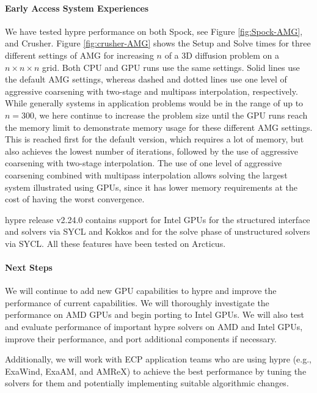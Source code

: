 \paragraph{Early Access System Experiences}

We have tested hypre performance on both Spock, see Figure \ref{fig:Spock-AMG}, and Crusher.  Figure \ref{fig:crusher-AMG} 
shows the Setup and Solve times for three different settings of AMG for increasing $n$ of a 3D diffusion problem on a $n \times n \times n$ grid. Both CPU and GPU runs use the same settings. Solid lines use the default AMG settings, whereas dashed and dotted lines use one level of aggressive coarsening with two-stage and multipass interpolation, respectively. While generally systems in application problems would be in the range of up to $n=300$, we here continue to increase the problem size until the GPU runs reach the memory limit to demonstrate memory usage for these different AMG settings. This is reached first for the default version, which requires a lot of memory, but also achieves the lowest number of iterations, followed by the use of aggressive coarsening with two-stage interpolation. The use of one level of aggressive coarsening combined with multipass interpolation allows solving the largest system illustrated using GPUs, since it has lower memory requirements at the cost of having the worst convergence.  

hypre release v2.24.0 contains support for Intel GPUs for the structured interface and solvers via SYCL and Kokkos and for the solve phase of unstructured solvers via SYCL. All these features have been tested on Arcticus.

\paragraph{Next Steps}
We will continue to add new GPU capabilities to hypre and improve the performance of current capabilities. We will thoroughly investigate the performance on AMD GPUs and begin porting to Intel GPUs.
We will also test and evaluate performance of important hypre solvers on AMD and Intel GPUs, improve their performance, and port additional components if necessary.

Additionally, we will work with ECP application teams who are using hypre (e.g., ExaWind, ExaAM, and AMReX) to achieve the best performance by tuning the solvers for them and potentially implementing suitable algorithmic changes.